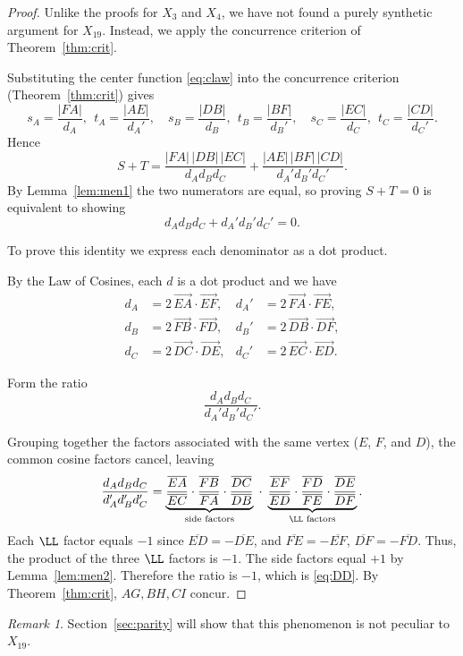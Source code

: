 \documentclass[12pt,a4paper]{amsart}
\theoremstyle{remark}
\newtheorem{remark}[theorem]{Remark}
\newcommand{\seg}[1]{\overline{#1}}
\newcommand{\vv}[1]{\overrightarrow{#1}}
\begin{document}
\begin{proof}
Unlike the proofs for $X_3$ and $X_4$, we have not found a purely synthetic
argument for $X_{19}$.
Instead, we apply the concurrence criterion of Theorem~\ref{thm:crit}.

Substituting the center function \eqref{eq:claw} into the concurrence criterion
(Theorem~\ref{thm:crit}) gives
\[
  s_A=\frac{|FA|}{d_A},\ \ t_A=\frac{|AE|}{d_A'},\quad
  s_B=\frac{|DB|}{d_B},\ \ t_B=\frac{|BF|}{d_B'},\quad
  s_C=\frac{|EC|}{d_C},\ \ t_C=\frac{|CD|}{d_C'} .
\]
Hence
\[
  S+T=\frac{|FA|\,|DB|\,|EC|}{d_Ad_Bd_C}
       +\frac{|AE|\,|BF|\,|CD|}{d_A'd_B'd_C'} .
\]
By Lemma~\ref{lem:men1} the two numerators are equal, so proving
$S+T=0$ is equivalent to showing
\begin{equation}\label{eq:DD}
  d_Ad_Bd_C+d_A'd_B'd_C'=0 .
\end{equation}

To prove this identity we express each denominator as a dot product.

By the Law of Cosines, each $d$ is a dot product and we have
\[
\begin{aligned}
 d_A&=2\,\vv{EA}\cdot\vv{EF}, & d_A'&=2\,\vv{FA}\cdot\vv{FE},\\
 d_B&=2\,\vv{FB}\cdot\vv{FD}, & d_B'&=2\,\vv{DB}\cdot\vv{DF},\\
 d_C&=2\,\vv{DC}\cdot\vv{DE}, & d_C'&=2\,\vv{EC}\cdot\vv{ED}.
\end{aligned}
\]

Form the ratio
\[
\frac{d_Ad_Bd_C}
     {d_A'd_B'd_C'}.
\]

Grouping together the factors associated with the same vertex
($E$, $F$, and $D$),
the common cosine factors cancel, leaving
\[
  \frac{d_Ad_Bd_C}{d_A'd_B'd_C'}
  =\underbrace{\frac{\seg{EA}}{\seg{EC}}\cdot\frac{\seg{FB}}{\seg{FA}}\cdot
    \frac{\seg{DC}}{\seg{DB}}}_{\text{side factors}}\;\cdot\;
   \underbrace{\frac{\seg{EF}}{\seg{ED}}\cdot\frac{\seg{FD}}{\seg{FE}}\cdot
    \frac{\seg{DE}}{\seg{DF}}}_{\LL\text{ factors}} .
\]
Each $\LL$ factor equals $-1$ since $\seg{ED}=-\seg{DE}$, and $\seg{FE}=-\seg{EF}$,
$\seg{DF}=-\seg{FD}$. Thus, the product of the three $\LL$ factors is $-1$.
The side factors equal $+1$ by Lemma~\ref{lem:men2}. Therefore the ratio is $-1$,
which is \eqref{eq:DD}.
By Theorem~\ref{thm:crit}, $AG,BH,CI$ concur.
\end{proof}

\begin{remark}
Section~\ref{sec:parity} will show that this phenomenon is not peculiar to $X_{19}$.

\end{remark}
\end{document}
